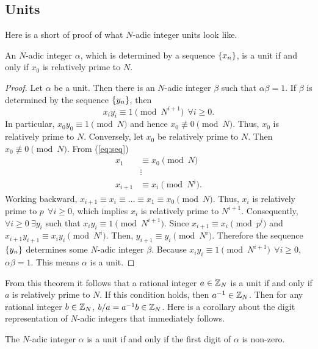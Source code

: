 \subsection{Units}
Here is a short of proof of what $N$-adic integer units look like.

\begin{theorem}\label{thm:units}
  An $N$-adic integer $\alpha$, which is determined by a sequence $\{x_n\}$, is
  a unit if and only if $x_0$ is relatively prime to $N$.
\end{theorem}
\begin{proof}
  Let $\alpha$ be a unit. Then there is an $N$-adic integer $\beta$ such that
  $\alpha\beta=1$. If $\beta$ is determined by the sequence $\{y_n\}$, then
  \begin{equation}\label{eq:units}
    x_iy_i\equiv1\pmod{N^{i+1}} \ \ \forall i \geq 0.
  \end{equation}
  In particular, $x_0y_0\equiv1\pmod N$ and hence $x_0\not\equiv0\pmod N$.
  Thus, $x_0$ is relatively prime to $N$.
  Conversely, let $x_0$ be relatively prime to $N$. Then $x_0\not\equiv0\pmod{N}$.
  From (\ref{eq:seq})
  \begin{align*}
    x_1 &\equiv x_0 \pmod N\\
    &\vdots \\
    x_{i+1} &\equiv x_i \pmod{N^i}. 
  \end{align*}
  Working backward, $x_{i+1} \equiv x_i \equiv \dots \equiv x_1 \equiv x_0 \pmod N$.
  Thus, $x_i$ is relatively prime to $p \ \ \forall i\geq0$, which implies
  $x_i$ is relatively prime to $N^{i+1}$. Consequently, $\forall i\geq0 \
  \exists y_i$ such that $x_iy_i \equiv 1 \pmod{N^{i+1}}$. Since
  $x_{i+1} \equiv x_i \pmod p^i$ and $x_{i+1}y_{i+1} \equiv x_iy_i \pmod{N^i}$.
  Then, $y_{i+1} \equiv y_i \pmod{N^i}$. Therefore the sequence $\{y_n\}$ determines
  some $N$-adic integer $\beta$. Because $x_iy_i \equiv 1 \pmod{N^{i+1}} \ \ \forall i \geq 0$,
  $\alpha\beta=1$. This means $\alpha$ is a unit.
\end{proof}

\par From this theorem it follows that a rational integer $a\in\mathbb{Z}_N$ is a unit if
and only if $a$ is relatively prime to $N$. If this condition holds, then $a^{-1}\in\mathbb{Z}_N$.
Then for any rational integer $b\in\mathbb{Z}_N$, $b/a=a^{-1}b\in\mathbb{Z}_N$. Here is a corollary
about the digit representation of $N$-adic integers that immediately follows.

\begin{corollary}
	The $N$-adic integer $\alpha$ is a unit if and only if the first digit of $\alpha$ is non-zero.
\end{corollary}


